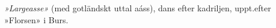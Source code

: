 \textit{»Largeasse»} (med gotländskt uttal a\textesh{}áss), dans efter kadriljen, uppt.\@ efter »Florsen» i Burs.